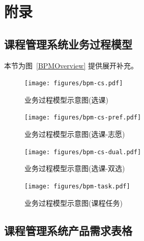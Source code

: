 \chapter*{附\qquad 录}

\renewcommand{\thechapter}{A}


\appendix

\section{课程管理系统业务过程模型}
\label{sec:appendix-bpm}

本节为图~\ref{BPMOverview} 提供展开补充。

\begin{figure}[!hbp]
  \begin{center}
    \texttt{[image: figures/bpm-cs.pdf]}
    \caption{业务过程模型示意图(选课)\label{BPMCourseRegister}}
  \end{center}
\end{figure}

\begin{figure}[!hbp]
  \begin{center}
    \texttt{[image: figures/bpm-cs-pref.pdf]}
    \caption{业务过程模型示意图(选课-志愿)\label{BPMCourseRegisterP}}
  \end{center}
\end{figure}

\begin{figure}[!hbp]
  \begin{center}
    \texttt{[image: figures/bpm-cs-dual.pdf]}
    \caption{业务过程模型示意图(选课-双选)\label{BPMCourseRegisterD}}
  \end{center}
\end{figure}

\begin{figure}[!hbp]
  \begin{center}
    \texttt{[image: figures/bpm-task.pdf]}
    \caption{业务过程模型示意图(课程任务)\label{BPMTask}}
  \end{center}
\end{figure}

\newpage

\section{课程管理系统产品需求表格}
\label{sec:appendix-requirement-table}

